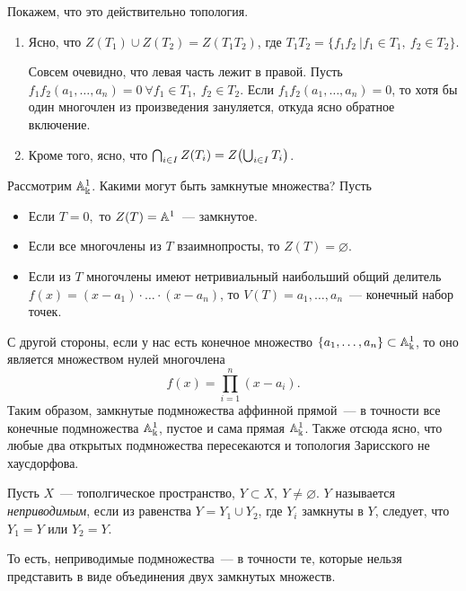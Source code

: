 	Покажем, что это действительно топология. 

	\begin{enumerate}
		\item Ясно, что $Z(T_1) \cup Z(T_2) = Z(T_1 T_2)$, где $T_1 T_2 = \{ f_1 f_2 \ \vert f_1 \in T_1, \ f_2 \in T_2 \}$. 

		Совсем очевидно, что левая часть лежит в правой. Пусть $f_1f_2(a_1, \ldots, a_n) = 0 \ \forall f_1 \in T_1, \ f_2 \in T_2$. Если $f_1 f_2(a_1, \ldots, a_n) = 0$, то хотя бы один многочлен из произведения зануляется, откуда ясно обратное включение. 

		\item Кроме того, ясно, что  $\bigcap_{i \in I} Z(T_i) = Z\lr*{\bigcup_{i \in I} T_i }$.

	\end{enumerate}

	\begin{example}
		Рассмотрим $\AA_{\bk}^1$. Какими могут быть замкнутые множества? Пусть 

		\begin{itemize}
			\item Если $T = 0,$ то $Z(T) = \AA^1$~--- замкнутое. 

			\item Если все многочлены из $T$ взаимнопросты, то $Z(T) = \varnothing$.

			\item Если из $T$ многочлены имеют нетривиальный наибольший общий делитель $f(x) = (x - a_1) \cdot \ldots \cdot (x - a_n)$, то $V(T) = a_1, \ldots, a_n$~--- конечный набор точек. 
		\end{itemize}

		С другой стороны, если у нас есть конечное множество $\{ a_1, \ldots, a_n \} \subset \AA_{\bk}^1$, то оно является множеством нулей многочлена 
		\[
			f(x) = \prod_{i = 1}^{n} (x - a_i).
		\]
		Таким образом, замкнутые подмножества аффинной прямой~--- в точности все конечные подмножества $\AA_{\bk}^1$, пустое и сама прямая $\AA_{\bk}^1$. Также отсюда ясно, что любые два открытых подмножества пересекаются и топология Зарисского не хаусдорфова. 


	\end{example}

	\begin{definition} 
		Пусть $X$~--- тополгическое пространство, $Y \subset X, \ Y \neq \varnothing$. $Y$ называется \emph{неприводимым}, если из равенства $Y = Y_1 \cup Y_2$, где $Y_i$ замкнуты в $Y$, следует, что $Y_1 = Y$ или $Y_2 = Y$.

		То есть, неприводимые подмножества~--- в точности те, которые нельзя представить в виде объединения двух замкнутых множеств.
	\end{definition}

